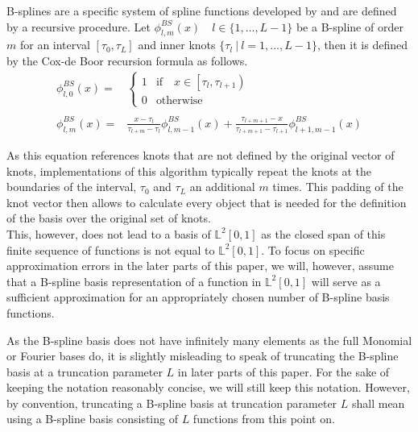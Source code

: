 \documentclass[11pt,twoside,a4paper]{article}
\begin{document}
	B-splines are a specific system of spline functions developed by \cite{de_boor_practical_1978} and are defined by a recursive procedure. Let $\phi_{l,m}^{BS}(x) \quad l \in \{1,\dots,L-1\}$ be a B-spline of order $m$ for an interval $[\tau_0, \tau_L]$ and inner knots $\{\tau_l \: \vert \: l = 1,\dots, L-1\}$, then it is defined by the Cox-de Boor recursion formula as follows. 
	\begin{equation}
		\begin{split}
			\phi_{l,0}^{BS}(x) = &
			\begin{cases}
				1 & \text{if} \quad x \in \left[\tau_l, \tau_{l+1}\right)\\
				0 & \text{otherwise}
			\end{cases}\\ \\
			\phi_{l,m}^{BS}(x) = &\frac{x - \tau_l}{\tau_{l+m} - \tau_l} \phi_{l,m-1}^{BS}(x) + \frac{\tau_{l+m+1} - x}{\tau_{l+m+1} - \tau_{l+1}} \phi_{l+1,m-1}^{BS}(x)
		\end{split}
	\end{equation}
	
	As this equation references knots that are not defined by the original vector of knots, implementations of this algorithm typically repeat the knots at the boundaries of the interval, $\tau_0$ and $\tau_L$ an additional $m$ times. This padding of the knot vector then allows to calculate every object that is needed for the definition of the basis over the original set of knots.\\
	
	This, however, does not lead to a basis of $\mathbb{L}^2[0,1]$ as the closed span of this finite sequence of functions is not equal to $\mathbb{L}^2[0,1]$. To focus on specific approximation errors in the later parts of this paper, we will, however, assume that a B-spline basis representation of a function in $\mathbb{L}^2[0,1]$ will serve as a sufficient approximation for an appropriately chosen number of B-spline basis functions. 
	
	As the B-spline basis does not have infinitely many elements as the full Monomial or Fourier bases do, it is slightly misleading to speak of truncating the B-spline basis at a truncation parameter $L$ in later parts of this paper. For the sake of keeping the notation reasonably concise, we will still keep this notation. However, by convention, truncating a B-spline basis at truncation parameter $L$ shall mean using a B-spline basis consisting of $L$ functions from this point on.
	
\end{document}
